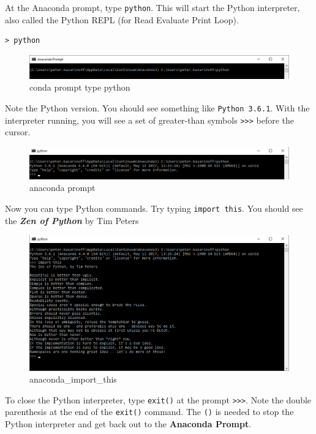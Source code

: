 \documentclass{book}
\makeatletter
\def\maxwidth{\ifdim\Gin@nat@width>\linewidth\linewidth
    \else\Gin@nat@width\fi}
\let\Oldincludegraphics\includegraphics
\renewcommand{\includegraphics}[1]{\Oldincludegraphics[width=.8\maxwidth]{#1}}
\makeatother
\begin{document}
At the Anaconda prompt, type \lstinline!python!. This will start the
Python interpreter, also called the Python REPL (for Read Evaluate Print
Loop).

\begin{lstlisting}
> python
\end{lstlisting}

\begin{figure}
\centering
\includegraphics{images/conda_prompt_type_python.png}
\caption{conda prompt type python}
\end{figure}

Note the Python version. You should see something like
\lstinline!Python 3.6.1!. With the interpreter running, you will see a
set of greater-than symbols \lstinline!>>>! before the cursor.

\begin{figure}
\centering
\includegraphics{images/conda_type_python.png}
\caption{anaconda prompt}
\end{figure}

Now you can type Python commands. Try typing \lstinline!import this!.
You should see the \textbf{\emph{Zen of Python}} by Tim Peters

\begin{figure}
\centering
\includegraphics{images/conda_import_this_output.png}
\caption{anaconda\_import\_this}
\end{figure}

To close the Python interpreter, type \lstinline!exit()! at the prompt
\lstinline!>>>!. Note the double parenthesis at the end of the
\lstinline!exit()! command. The \lstinline!()! is needed to stop the
Python interpreter and get back out to the \textbf{Anaconda Prompt}.
\end{document}
